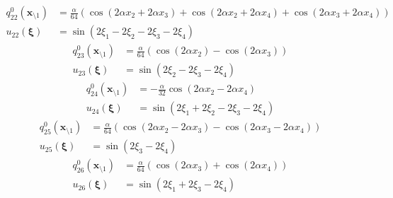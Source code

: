 \documentclass[11pt]{jfm}
\numberwithin{equation}{section}
\begin{document}
\vspace{-0.4cm}
\begin{subequations}
\label{A25}
\begin{align}
q_{22}^0(\boldsymbol{x}_{\setminus 1})&=\frac{\alpha}{64}   (\cos (2 \alpha  x_2+2 \alpha  x_3)+\cos (2 \alpha  x_2+2 \alpha  x_4)+\cos (2 \alpha  x_3+2 \alpha  x_4))
\label{A25a} \\
u_{22}(\boldsymbol{\xi})&=\sin (2 \xi_1-2 \xi_2-2 \xi_3-2 \xi_4)
\label{A25b}
\end{align}\end{subequations}
\vspace{-0.4cm}
\begin{subequations}
\label{A26}
\begin{align}
q_{23}^0(\boldsymbol{x}_{\setminus 1})&=\frac{\alpha}{64}   (\cos (2 \alpha  x_2)-\cos (2 \alpha  x_3))
\label{A26a} \\
u_{23}(\boldsymbol{\xi})&=\sin (2 \xi_2-2 \xi_3-2 \xi_4)
\label{A26b}
\end{align}\end{subequations}
\vspace{-0.4cm}
\begin{subequations}
\label{A27}
\begin{align}
q_{24}^0(\boldsymbol{x}_{\setminus 1})&=-\frac{\alpha}{32}  \cos (2 \alpha  x_2-2 \alpha  x_4)
\label{A27a} \\
u_{24}(\boldsymbol{\xi})&=\sin (2 \xi_1+2 \xi_2-2 \xi_3-2 \xi_4)
\label{A27b}
\end{align}\end{subequations}
\vspace{-0.4cm}
\begin{subequations}
\label{A28}
\begin{align}
q_{25}^0(\boldsymbol{x}_{\setminus 1})&=\frac{\alpha}{64}   (\cos (2 \alpha  x_2-2 \alpha  x_3)-\cos (2 \alpha  x_3-2 \alpha  x_4))
\label{A28a} \\
u_{25}(\boldsymbol{\xi})&=\sin (2 \xi_3-2 \xi_4)
\label{A28b}
\end{align}\end{subequations}
\vspace{-0.4cm}
\begin{subequations}
\label{A29}
\begin{align}
q_{26}^0(\boldsymbol{x}_{\setminus 1})&=\frac{\alpha}{64}   (\cos (2 \alpha  x_3)+\cos (2 \alpha  x_4))
\label{A29a} \\
u_{26}(\boldsymbol{\xi})&=\sin (2 \xi_1+2 \xi_3-2 \xi_4)
\label{A29b}
\end{align}\end{subequations}
\end{document}

